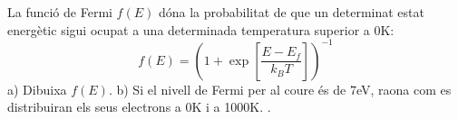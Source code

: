 \begin{exr}
La funció de Fermi $f(E)$ dóna la probabilitat de que un determinat estat energètic sigui ocupat a una determinada temperatura superior a 0K:
\[f(E)=\left( 1 + \exp \left[ \frac{E-E_f}{k_B T} \right] \right)^{-1}\]
a) Dibuixa $f(E)$. b) Si el nivell de Fermi per al coure és de 7eV, raona com es distribuiran els seus electrons a 0K i a 1000K.
\label{Ex:Fermi}.
\end{exr}